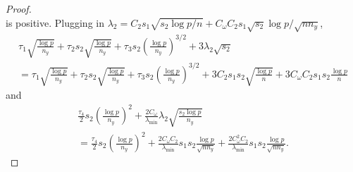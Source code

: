 \documentclass[11pt]{article}
\numberwithin{equation}{section}
\numberwithin{theorem}{section}
\theoremstyle{definition}
\theoremstyle{remark}
\begin{document}
\begin{proof}
\begin{equation}
\end{equation}
is positive.
Plugging in $\lambda_2 = C_2 s_1 \sqrt{s_2 \log p / n} + C_\omega C_2 s_1 \sqrt{s_2} \log p / \sqrt{n n_y}$,
\begin{multline}
\tau_1 \sqrt{\frac{\log p}{n_y}} + \tau_2 s_2 \sqrt{\frac{\log p}{n_y}} + \tau_3 s_2 \left( \frac{\log p}{n_y} \right)^{3/2} + 3\lambda_2 \sqrt{s_2} \\
= \tau_1 \sqrt{\frac{\log p}{n_y}} + \tau_2 s_2 \sqrt{\frac{\log p}{n_y}} + \tau_3 s_2 \left( \frac{\log p}{n_y} \right)^{3/2} + 3C_2 s_1 s_2 \sqrt{\frac{\log p}{n}} + 3 C_\omega C_2 s_1 s_2 \frac{\log p}{n}
\end{multline}
and
\begin{multline}
\frac{\tau_4}{2} s_2 \left( \frac{\log p}{n_y} \right)^2 + \frac{2C_\omega}{\lambda_{\min}} \lambda_2 \sqrt{\frac{s_2 \log p}{n_y}} \\
= \frac{\tau_4}{2} s_2 \left( \frac{\log p}{n_y} \right)^2 + \frac{2C_\omega C_2}{\lambda_{\min}} s_1 s_2 \frac{\log p}{\sqrt{n n_y}} + \frac{2C_\omega^2 C_2}{\lambda_{\min}} s_1 s_2 \frac{\log p}{\sqrt{n n_y}}.
\end{multline}


\end{proof}
\end{document}
